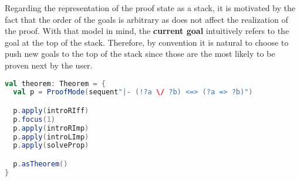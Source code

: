 Regarding the representation of the proof state as a stack, it is motivated by the fact that the order of the goals is arbitrary as does not affect the realization of the proof. With that model in mind, the \textbf{current goal} intuitively refers to the goal at the top of the stack. Therefore, by convention it is natural to choose to push new goals to the top of the stack since those are the most likely to be proven next by the user.

\begin{lstlisting}[language=Scala,caption={[Backward proof]{Example of a backward proof.}},label={lst:proof-interaction},captionpos=b]
val theorem: Theorem = {
  val p = ProofMode(sequent"|- (!?a \/ ?b) <=> (?a => ?b)")

  p.apply(introRIff)
  p.focus(1)
  p.apply(introRImp)
  p.apply(introLImp)
  p.apply(solveProp)

  p.asTheorem()
}
\end{lstlisting}

